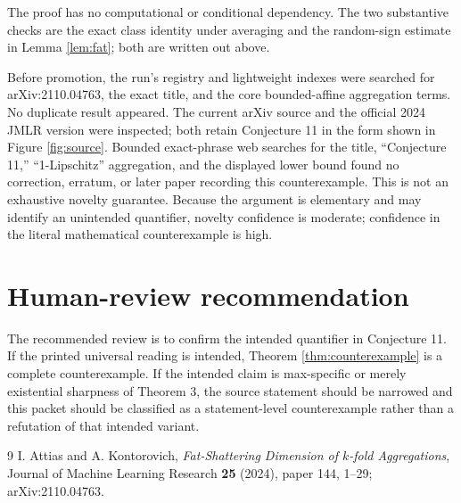 \documentclass[11pt]{article}
\begin{document}
The proof has no computational or conditional dependency.  The two
substantive checks are the exact class identity under averaging and the
random-sign estimate in Lemma \ref{lem:fat}; both are written out above.

Before promotion, the run's registry and lightweight indexes were searched
for arXiv:2110.04763, the exact title, and the core bounded-affine aggregation
terms.  No duplicate result appeared.  The current arXiv source and the
official 2024 JMLR version were inspected; both retain Conjecture 11 in the
form shown in Figure \ref{fig:source}.  Bounded exact-phrase web searches for
the title, ``Conjecture 11,'' ``1-Lipschitz'' aggregation, and the displayed
lower bound found no correction, erratum, or later paper recording this
counterexample.  This is not an exhaustive novelty guarantee.  Because the
argument is elementary and may identify an unintended quantifier, novelty
confidence is moderate; confidence in the literal mathematical
counterexample is high.

\section{Human-review recommendation}

The recommended review is to confirm the intended quantifier in Conjecture
11.  If the printed universal reading is intended, Theorem
\ref{thm:counterexample} is a complete counterexample.  If the intended
claim is max-specific or merely existential sharpness of Theorem 3, the
source statement should be narrowed and this packet should be classified as
a statement-level counterexample rather than a refutation of that intended
variant.

\begin{thebibliography}{9}
I. Attias and A. Kontorovich,
\emph{Fat-Shattering Dimension of \(k\)-fold Aggregations},
Journal of Machine Learning Research \textbf{25} (2024), paper 144, 1--29;
arXiv:2110.04763.
\end{thebibliography}
\end{document}
